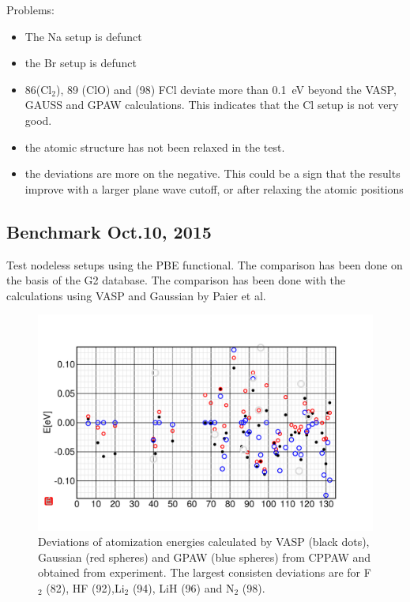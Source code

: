 \documentclass{book}
\begin{document}
Problems:
\begin{itemize}
\item The Na setup is defunct
\item the Br setup is defunct
\item 86(Cl$_2$), 89 (ClO) and (98) FCl deviate more than 0.1~eV
  beyond the VASP, GAUSS and GPAW calculations. This indicates that the
  Cl setup is not very good.
\item the atomic structure has not been relaxed in the test.
\item the deviations are more on the negative. This could be a sign
  that the results improve with a larger plane wave cutoff, or after
  relaxing the atomic positions
\end{itemize}


\subsection*{Benchmark Oct.10, 2015}
Test nodeless setups using the PBE
functional\cite{perdew96_prl77_3865}. The comparison has been done on
the basis of the G2 database. The comparison has been done with the
calculations using VASP and Gaussian by Paier et
al.\cite{paier05_jcp122_234102}


\begin{figure}[h!]
\includegraphics[width=\linewidth]{Figs/151010benchmark/g2benchmark}
\caption{\label{fig:151010benchmark}Deviations of atomization energies
  calculated by VASP (black dots), Gaussian (red spheres) and GPAW
  (blue spheres) from CPPAW and obtained from experiment. The largest
  consisten deviations are for F$_2$ (82), HF (92),Li$_2$ (94), LiH
  (96) and N$_2$ (98). }
\end{figure}
\end{document}
